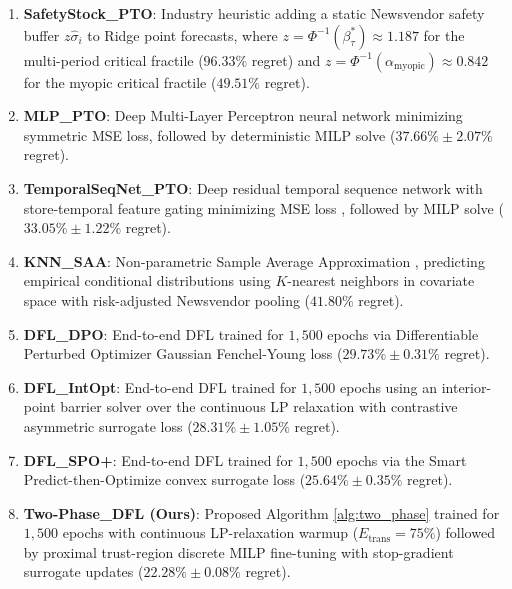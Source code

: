 \documentclass[11pt,a4paper]{article}
\theoremstyle{definition}
\theoremstyle{remark}
\begin{document}
\begin{enumerate}[label=\arabic*.]
    \item \textbf{SafetyStock\_PTO}: Industry heuristic adding a static Newsvendor safety buffer $z \hat{\sigma}_i$ to Ridge point forecasts, where $z = \Phi^{-1}(\beta_\tau^*) \approx 1.187$ for the multi-period critical fractile ($96.33\%$ regret) and $z = \Phi^{-1}(\alpha_{\text{myopic}}) \approx 0.842$ for the myopic critical fractile ($49.51\%$ regret).
    \item \textbf{MLP\_PTO}: Deep Multi-Layer Perceptron neural network minimizing symmetric MSE loss, followed by deterministic MILP solve ($37.66\% \pm 2.07\%$ regret).
    \item \textbf{TemporalSeqNet\_PTO}: Deep residual temporal sequence network with store-temporal feature gating minimizing MSE loss \citep{lim2021temporal}, followed by MILP solve ($33.05\% \pm 1.22\%$ regret).
    \item \textbf{KNN\_SAA}: Non-parametric Sample Average Approximation \citep{bertsimas2020predictive}, predicting empirical conditional distributions using $K$-nearest neighbors in covariate space with risk-adjusted Newsvendor pooling ($41.80\%$ regret).
    \item \textbf{DFL\_DPO}: End-to-end DFL trained for $1,500$ epochs via Differentiable Perturbed Optimizer Gaussian Fenchel-Young loss \citep{berthet2020learning} ($29.73\% \pm 0.31\%$ regret).
    \item \textbf{DFL\_IntOpt}: End-to-end DFL trained for $1,500$ epochs using an interior-point barrier solver over the continuous LP relaxation with contrastive asymmetric surrogate loss \citep{mandi2020interior} ($28.31\% \pm 1.05\%$ regret).
    \item \textbf{DFL\_SPO+}: End-to-end DFL trained for $1,500$ epochs via the Smart Predict-then-Optimize convex surrogate loss \citep{elmachtoub2022smart} ($25.64\% \pm 0.35\%$ regret).
    \item \textbf{Two-Phase\_DFL (Ours)}: Proposed Algorithm \ref{alg:two_phase} trained for $1,500$ epochs with continuous LP-relaxation warmup ($E_{\text{trans}} = 75\%$) followed by proximal trust-region discrete MILP fine-tuning with stop-gradient surrogate updates ($22.28\% \pm 0.08\%$ regret).
\end{enumerate}
\end{document}

